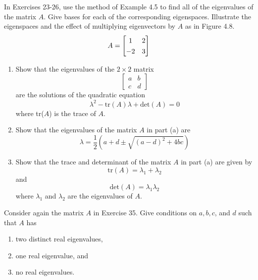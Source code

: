 \documentclass[12pt,letterpaper]{hmcpset}
\newcommand{\pn}[1]{\left( #1 \right)}
\newcommand{\m}[1]{\renewcommand*{\arraystretch}{1.3} \begin{bmatrix} #1 \end{bmatrix}}
\begin{document}

\begin{problem}[4.1.26]
  In Exercises 23-26, use the method of Example 4.5 to find all of the eigenvalues of the matrix $A$. Give bases for each of the corresponding eigenspaces. Illustrate the eigenspaces and the effect of multiplying eigenvectors by $A$ as in Figure 4.8.
  $$ A = \m{1 & 2 \\ -2 & 3} $$
\end{problem}

\begin{solution}
\vfill
\end{solution}
\newpage

\begin{problem}[4.1.35]
  \begin{enumerate}
    \item Show that the eigenvalues of the $2 \times 2$ matrix
    $$ \m{a & b \\ c & d} $$
    are the solutions of the quadratic equation
    $$ \lambda^2 - \text{tr}(A) \lambda + \text{det}(A) = 0 $$
    where tr($A$) is the trace of $A$.

    \item Show that the eigenvalues of the matrix $A$ in part (a) are
    $$ \lambda = \frac{1}{2} \pn{ a + d \pm \sqrt{(a - d)^2 + 4bc} } $$

    \item Show that the trace and determinant of the matrix $A$ in part (a) are given by
    $$ \text{tr}(A) = \lambda_1 + \lambda_2 $$
    and
    $$ \text{det}(A) = \lambda_1 \lambda_2 $$
    where $\lambda_1$ and $\lambda_2$ are the eigenvalues of $A$.
  \end{enumerate}
\end{problem}

\begin{solution}
\vfill
\end{solution}
\newpage

\begin{problem}[4.1.36]
  Consider again the matrix $A$ in Exercise 35. Give conditions on $a, b, c$, and $d$ such that $A$ has
  \begin{enumerate}
    \item two distinct real eigenvalues,

    \item one real eigenvalue, and

    \item no real eigenvalues.
  \end{enumerate}
\end{problem}
\end{document}
